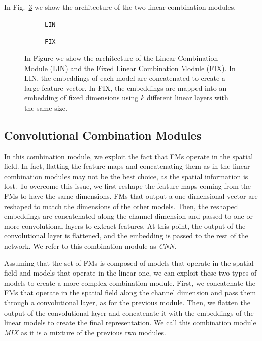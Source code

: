 In Fig.~\ref{fig:lin_combination} we show the architecture of the two linear combination modules.


\begin{figure}[ht]
    \centering
    \begin{subfigure}[b]{0.47\textwidth}
        \centering
        \fbox{\rule[-.5cm]{0cm}{4cm} \rule[-.5cm]{4cm}{0cm}}
        \caption{\texttt{LIN}}
        \label{fig:lin}
    \end{subfigure}
    \hfill
    \begin{subfigure}[b]{0.47\textwidth}
        \centering
        \fbox{\rule[-.5cm]{0cm}{4cm} \rule[-.5cm]{4cm}{0cm}}
        \caption{\texttt{FIX}}
        \label{fig:fix_lin}
    \end{subfigure}

    \caption{In Figure we show the architecture of the Linear Combination Module (LIN) and the Fixed Linear Combination Module (FIX). In LIN, the embeddings of each model are concatenated to create a large feature vector. In FIX, the embeddings are mapped into an embedding of fixed dimensions using $k$ different linear layers with the same size.}
    \label{fig:lin_combination}
\end{figure}




\subsection{Convolutional Combination Modules}
\label{subsec:convolutional_combination}
In this combination module, we exploit the fact that FMs operate in the spatial field.
In fact, flatting the feature maps and concatenating them as in the linear combination modules may not be the best choice, as the spatial information is lost.
To overcome this issue, we first reshape the feature maps coming from the FMs to have the same dimensions.
FMs that output a one-dimensional vector are reshaped to match the dimensions of the other models.
Then, the reshaped embeddings are concatenated along the channel dimension and passed to one or more convolutional layers to extract features.
At this point, the output of the convolutional layer is flattened, and the embedding is passed to the rest of the network.
We refer to this combination module as \textit{CNN}.


Assuming that the set of FMs is composed of models that operate in the spatial field and models that operate in the linear one, we can exploit these two types of models to create a more complex combination module.
First, we concatenate the FMs that operate in the spatial field along the channel dimension and pass them through a convolutional layer, as for the previous module.
Then, we flatten the output of the convolutional layer and concatenate it with the embeddings of the linear models to create the final representation.
We call this combination module \textit{MIX} as it is a mixture of the previous two modules.

